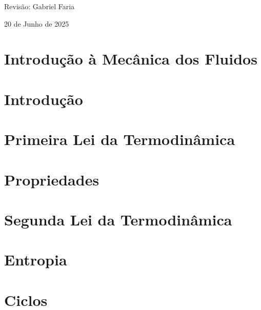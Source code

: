 \documentclass[a4paper,12pt, openany]{book}
\theoremstyle{mystyle}
\begin{document}
\vspace{1cm}
Revisão: Gabriel Faria
\vspace{1cm}

20 de Junho de 2025

\tableofcontents

\mainmatter


\chapter{Introdução à Mecânica dos Fluidos}


\chapter{Introdução}


\chapter{Primeira Lei da Termodinâmica}


\chapter{Propriedades}


\chapter{Segunda Lei da Termodinâmica}


\chapter{Entropia}


\chapter{Ciclos}



\appendix
\clearpage
\chapter*{}
\vspace*{-5em} %
\thispagestyle{empty}
\end{document}
